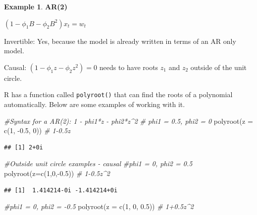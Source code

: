 \documentclass[
]{book}
\newenvironment{Shaded}{\begin{snugshade}}{\end{snugshade}}
\newcommand{\AttributeTok}[1]{\textcolor[rgb]{0.77,0.63,0.00}{#1}}
\newcommand{\CommentTok}[1]{\textcolor[rgb]{0.56,0.35,0.01}{\textit{#1}}}
\newcommand{\DecValTok}[1]{\textcolor[rgb]{0.00,0.00,0.81}{#1}}
\newcommand{\FloatTok}[1]{\textcolor[rgb]{0.00,0.00,0.81}{#1}}
\newcommand{\FunctionTok}[1]{\textcolor[rgb]{0.00,0.00,0.00}{#1}}
\newcommand{\NormalTok}[1]{#1}
\newcommand{\SpecialCharTok}[1]{\textcolor[rgb]{0.00,0.00,0.00}{#1}}
\theoremstyle{definition}
\theoremstyle{definition}
\newtheorem{example}{Example}[chapter]
\theoremstyle{definition}
\theoremstyle{definition}
\theoremstyle{remark}
\begin{document}
\begin{example}

\textbf{AR(2)}

\((1-\phi_1B-\phi_2B^2)x_t=w_t\)

Invertible: Yes, because the model is already written in terms of an AR only model.

Causal: \((1-\phi_1z-\phi_2z^2) = 0\) needs to have roots \(z_1\) and \(z_2\) outside of the unit circle.

R has a function called \texttt{polyroot()} that can find the roots of a polynomial automatically. Below are some examples of working with it.

\begin{Shaded}
\begin{Highlighting}[]
\CommentTok{\#Syntax for a AR(2): 1 {-} phi1*z {-} phi2*z\^{}2 }
\CommentTok{\#  phi1 = 0.5, phi2 = 0}
\FunctionTok{polyroot}\NormalTok{(}\AttributeTok{z =} \FunctionTok{c}\NormalTok{(}\DecValTok{1}\NormalTok{, }\SpecialCharTok{{-}}\FloatTok{0.5}\NormalTok{, }\DecValTok{0}\NormalTok{))   }\CommentTok{\# 1{-}0.5z}
\end{Highlighting}
\end{Shaded}

\begin{verbatim}
## [1] 2+0i
\end{verbatim}

\begin{Shaded}
\begin{Highlighting}[]
\CommentTok{\#Outside unit circle examples {-} causal}
\CommentTok{\#phi1 = 0, phi2 = 0.5 }
\FunctionTok{polyroot}\NormalTok{(}\AttributeTok{z=}\FunctionTok{c}\NormalTok{(}\DecValTok{1}\NormalTok{,}\DecValTok{0}\NormalTok{,}\SpecialCharTok{{-}}\FloatTok{0.5}\NormalTok{)) }\CommentTok{\# 1{-}0.5z\^{}2}
\end{Highlighting}
\end{Shaded}

\begin{verbatim}
## [1]  1.414214-0i -1.414214+0i
\end{verbatim}

\begin{Shaded}
\begin{Highlighting}[]
\CommentTok{\#phi1 = 0, phi2 = {-}0.5 }
\FunctionTok{polyroot}\NormalTok{(}\AttributeTok{z =} \FunctionTok{c}\NormalTok{(}\DecValTok{1}\NormalTok{, }\DecValTok{0}\NormalTok{, }\FloatTok{0.5}\NormalTok{))   }\CommentTok{\# 1+0.5z\^{}2}
\end{Highlighting}
\end{Shaded}


\end{example}
\end{document}

